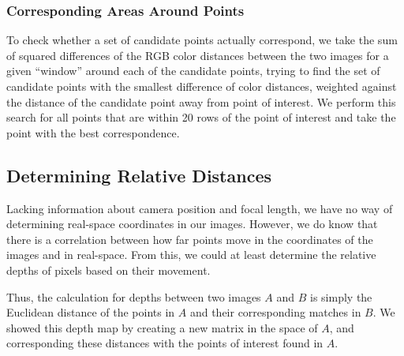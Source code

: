 \subsubsection{Corresponding Areas Around Points}
To check whether a set of candidate points actually correspond, we take the sum of squared differences of the RGB color distances between the two images for a given ``window'' around each of the candidate points, trying to find the set of candidate points with the smallest difference of color distances, weighted against the distance of the candidate point away from point of interest. We perform this search for all points that are within 20 rows of the point of interest and take the point with the best correspondence. 

\subsection{Determining Relative Distances}
Lacking information about camera position and focal length, we have no way of determining real-space coordinates in our images. However, we do know that there is a correlation between how far points move in the coordinates of the images and in real-space. From this, we could at least determine the relative depths of pixels based on their movement.

Thus, the calculation for depths between two images $A$ and $B$ is simply the Euclidean distance of the points in $A$ and their corresponding matches in $B$. We showed this depth map by creating a new matrix in the space of $A$, and corresponding these distances with the points of interest found in $A$.
